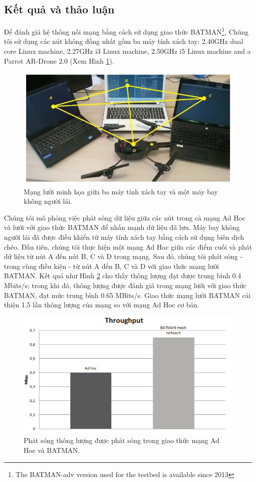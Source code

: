 \documentclass[11pt,openany]{book}
\begin{document}
\subsection{Kết quả và thảo luận}
Để đánh giá hệ thống nối mạng bằng cách sử dụng giao thức BATMAN\footnote{The BATMAN-adv version used for the testbed is available since 2013}, Chúng tôi sử dụng các nút không đồng nhất gồm ba máy tính xách tay: 2.40GHz dual core Linux machine, 2.27GHz i3 Linux machine, 2.50GHz i5 Linux machine and a Parrot AR-Drone 2.0 (Xem Hình \ref{fig:4.3}).
\begin{figure}[H]
    \centering
    \includegraphics[scale=0.3]{assets/4_3.png}
    \caption{Mạng lưới minh họa giữa ba máy tính xách tay và một máy bay không người lái.}
    \label{fig:4.3}
\end{figure}
Chúng tôi mô phỏng việc phát sóng dữ liệu giữa các nút trong cả mạng Ad Hoc và lưới với giao thức BATMAN để nhấn mạnh dữ liệu đã lưu. Máy bay không người lái đã được điều khiển từ máy tính xách tay bằng cách sử dụng biên dịch chéo. Đầu tiên, chúng tôi thực hiện một mạng Ad Hoc giữa các điểm cuối và phát dữ liệu từ nút A đến nút B, C và D trong mạng. Sau đó, chúng tôi phát sóng - trong cùng điều kiện - từ nút A đến B, C và D với giao thức mạng lưới BATMAN. Kết quả như Hình \ref{fig:4.4} cho thấy thông lượng đạt được trung bình 0.4 Mbits/s; trong khi đó, thông lượng được đánh giá trong mạng lưới với giao thức BATMAN, đạt mức trung bình 0.65 MBits/s. Giao thức mạng lưới BATMAN cải thiện 1,5 lần thông lượng của mạng so với mạng Ad Hoc cơ bản.
\begin{figure}[H]
    \centering
    \includegraphics[scale=0.4]{assets/4_4.png}
    \caption{Phát sóng thông lượng được phát sóng trong giao thức mạng Ad Hoc và BATMAN.}
    \label{fig:4.4}
\end{figure}
\end{document}
